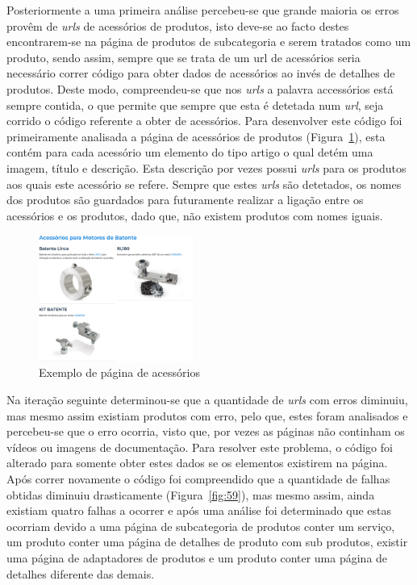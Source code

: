 Posteriormente a uma primeira análise percebeu-se que grande maioria os erros provêm de \textit{urls} de acessórios de produtos, isto deve-se ao facto destes encontrarem-se na página de produtos de subcategoria e serem tratados como um produto, sendo assim, sempre que se trata de um url de acessórios seria necessário correr código para obter dados de acessórios ao invés de detalhes de produtos. Deste modo, compreendeu-se que nos \textit{urls} a palavra accessórios está sempre contida, o que permite que sempre que esta é detetada num \textit{url}, seja corrido o código referente a obter de acessórios. Para desenvolver este código foi primeiramente analisada a página de acessórios de produtos (Figura~\ref*{fig:58}), esta contém para cada acessório um elemento do tipo artigo o qual detém uma imagem, título e descrição. Esta descrição por vezes possui \textit{urls} para os produtos aos quais este acessório se refere. Sempre que estes \textit{urls} são detetados, os nomes dos produtos são guardados para futuramente realizar a ligação entre os acessórios e os produtos, dado que, não existem produtos com nomes iguais. 

\begin{figure}[htb]
  \centering
  
  \includegraphics[width=0.45\textwidth]{images/implementacao/scraper/pagina_acessorios.png}
  \caption{Exemplo de página de acessórios}
  \label{fig:58}
\end{figure}

\newpage

Na iteração seguinte determinou-se que a quantidade de \textit{urls} com erros diminuiu, mas mesmo assim existiam produtos com erro, pelo que, estes foram analisados e percebeu-se que o erro ocorria, visto que, por vezes as páginas não continham os vídeos ou imagens de documentação. Para resolver este problema, o código foi alterado para somente obter estes dados se os elementos existirem na página. Após correr novamente o código foi compreendido que a quantidade de falhas obtidas diminuiu drasticamente (Figura~\ref{fig:59}), mas mesmo assim, ainda existiam quatro falhas a ocorrer e após uma análise foi determinado que estas ocorriam devido a uma página de subcategoria de produtos conter um serviço, um produto conter uma página de detalhes de produto com sub produtos, existir uma página de adaptadores de produtos e um produto conter uma página de detalhes diferente das demais.

